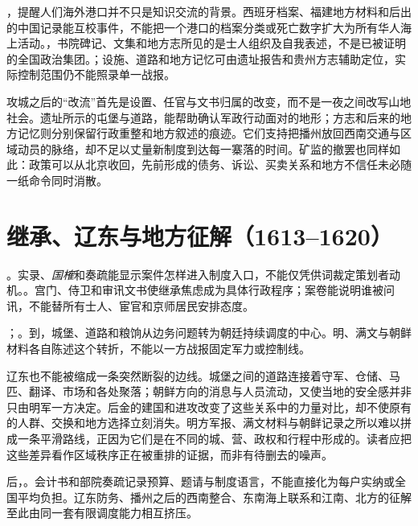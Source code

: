 ，提醒人们海外港口并不只是知识交流的背景。西班牙档案、福建地方材料和后出的中国记录能互校事件，不能把一个港口的档案分类或死亡数字扩大为所有华人海上活动。，书院碑记、文集和地方志所见的是士人组织及自我表述，不是已被证明的全国政治集团。；设施、道路和地方记忆可由遗址报告和贵州方志辅助定位，实际控制范围仍不能照录单一战报。

攻城之后的“改流”首先是设置、任官与文书归属的改变，而不是一夜之间改写山地社会。遗址所示的屯堡与道路，能帮助确认军政行动面对的地形；方志和后来的地方记忆则分别保留行政重整和地方叙述的痕迹。它们支持把播州放回西南交通与区域动员的脉络，却不足以丈量新制度到达每一寨落的时间。矿监的撤罢也同样如此：政策可以从北京收回，先前形成的债务、诉讼、买卖关系和地方不信任未必随一纸命令同时消散。

\section{继承、辽东与地方征解（1613--1620）}

。实录、\textit{国榷}和奏疏能显示案件怎样进入制度入口，不能仅凭供词裁定策划者动机。。宫门、侍卫和审讯文书使继承焦虑成为具体行政程序；案卷能说明谁被问讯，不能替所有士人、宦官和京师居民安排态度。

；。到，城堡、道路和粮饷从边务问题转为朝廷持续调度的中心。明、满文与朝鲜材料各自陈述这个转折，不能以一方战报固定军力或控制线。

辽东也不能被缩成一条突然断裂的边线。城堡之间的道路连接着守军、仓储、马匹、翻译、市场和各处聚落；朝鲜方向的消息与人员流动，又使当地的安全感并非只由明军一方决定。后金的建国和进攻改变了这些关系中的力量对比，却不使原有的人群、交换和地方选择立刻消失。明方军报、满文材料与朝鲜记录之所以难以拼成一条平滑路线，正因为它们是在不同的城、营、政权和行程中形成的。读者应把这些差异看作区域秩序正在被重排的证据，而非有待删去的噪声。

后，。会计书和部院奏疏记录预算、题请与制度语言，不能直接化为每户实纳或全国平均负担。辽东防务、播州之后的西南整合、东南海上联系和江南、北方的征解至此由同一套有限调度能力相互挤压。

